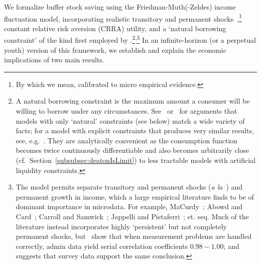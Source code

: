 \documentclass[BufferStockTheory]{subfiles}
\begin{document}
We formalize buffer stock saving using the Friedman-Muth(-Zeldes) income fluctuation model, incorporating realistic transitory and permanent shocks~\citep{friedmanATheory, muthOptimal, zeldesStochastic},\footnote{By which we mean, calibrated to micro empirical evidence.}
constant relative risk aversion (CRRA) utility, and a `natural borrowing constraint' of the kind first employed by \cite{zeldesStochastic}.\footnote{A natural borrowing constraint is the maximum amount a consumer will be willing to borrow under any circumstances.
See~\cite{carrollBSLCPIH} or~\cite{gpLifeCycle} for arguments that models with only `natural' constraints (see below) match a wide variety of facts; for a model with explicit constraints that produces very similar results, see, e.g.~\cite{Cagetti}.
They are analytically convenient as the consumption function becomes twice continuously differentiable and also becomes arbitrarily close (cf.\ Section~\ref{subsubsec:deatonIsLimit}) to less tractable models with artificial liquidity constraints.}\textsuperscript{,}\footnote{The model permits separate transitory and permanent shocks (\textit{a la}~\cite{muthOptimal}) and permanent growth in income, which a large empirical literature finds to be of dominant importance in microdata.
For example, MaCurdy~\citeyearpar{macurdyTimeseries}; Abowd and Card~\citeyearpar{acCovariance}; Carroll and Samwick~\citeyearpar{csNature}; Jappelli and Pistaferri~\citeyear{jpCins}; et.
seq.
Much of the literature instead incorporates highly `persistent' but not completely permanent shocks, but~\cite{dhmImproving} show that when measurement problems are handled correctly, admin data yield serial correlation coefficients $0.98-1.00$; and~\cite{dmHowMuch} suggests that survey data support the same conclusion.}
In an infinite-horizon (or a \cite{blanchardFinite} perpetual youth) version of this framework, we establish and explain the economic implications of two main results.
\end{document}
